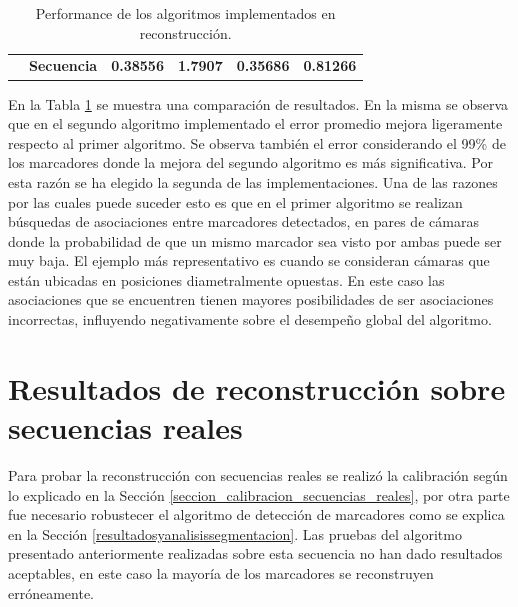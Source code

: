 \begin{table}[ht!]
{\begin{tabular}{cc|c|c|c|c|}
\multicolumn{1}{l|}{}                                                         & \textbf{Secuencia }                                            & \textbf{0.38556 }                                                         & \textbf{1.7907    }                                                    & \textbf{0.35686}                                                         &\textbf{ 0.81266}                                                       \\ \cline{2-6} 
\end{tabular}
}
\caption{Performance de los algoritmos implementados en reconstrucción. }
\label{table_performance_reconstruccion}
\end{table}

En la Tabla \ref{table_performance_reconstruccion} se muestra una comparación de resultados. En la misma se observa que en el segundo algoritmo implementado el error promedio mejora ligeramente respecto al primer algoritmo. Se observa también el error considerando el 99\% de los marcadores donde la mejora del segundo algoritmo es más significativa. Por esta razón se ha elegido la segunda de las implementaciones.
Una de las razones por las cuales puede suceder esto es que en el primer algoritmo se realizan búsquedas de asociaciones entre marcadores detectados, en pares de cámaras donde la probabilidad de que un mismo marcador sea visto por ambas puede ser muy baja. El ejemplo más representativo es cuando se consideran cámaras que están  ubicadas en posiciones diametralmente opuestas. En este caso las asociaciones que se encuentren tienen mayores posibilidades de ser asociaciones incorrectas, influyendo negativamente sobre el desempeño global del algoritmo. 



\section{Resultados de reconstrucción sobre secuencias reales}

Para probar la reconstrucción con secuencias reales se realizó la calibración según lo explicado en la Sección \ref{seccion_calibracion_secuencias_reales}, por otra parte fue necesario robustecer el algoritmo de detección de marcadores como se explica en la Sección \ref{resultadosyanalisissegmentacion}. Las pruebas del algoritmo presentado anteriormente realizadas sobre esta secuencia no han dado resultados aceptables, en este caso la mayoría de los marcadores se reconstruyen erróneamente. 


